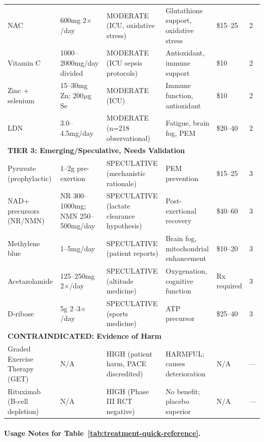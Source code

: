\begin{table}[htbp]
\begin{tabular}{p{3cm}p{2cm}p{2.5cm}p{3cm}p{2cm}p{1.5cm}}
NAC & 600mg 2$\times$/day & MODERATE (ICU, oxidative stress) & Glutathione support, oxidative stress & \$15--25 & 2 \\
Vitamin C & 1000--2000mg/day divided & MODERATE (ICU sepsis protocols) & Antioxidant, immune support & \$10 & 2 \\
Zinc + selenium & 15--30mg Zn; 200$\mu$g Se & MODERATE (ICU) & Immune function, antioxidant & \$10 & 2 \\
LDN & 3.0--4.5mg/day & MODERATE (n=218 observational) & Fatigue, brain fog, PEM & \$20--40 & 2 \\
\midrule
\multicolumn{6}{l}{\textbf{TIER 3: Emerging/Speculative, Needs Validation}} \\
\midrule
Pyruvate (prophylactic) & 1--2g pre-exertion & SPECULATIVE (mechanistic rationale) & PEM prevention & \$15--25 & 3 \\
NAD+ precursors (NR/NMN) & NR 300--1000mg; NMN 250--500mg/day & SPECULATIVE (lactate clearance hypothesis) & Post-exertional recovery & \$40--60 & 3 \\
Methylene blue & 1--5mg/day & SPECULATIVE (patient reports) & Brain fog, mitochondrial enhancement & \$10--20 & 3 \\
Acetazolamide & 125--250mg 2$\times$/day & SPECULATIVE (altitude medicine) & Oxygenation, cognitive function & Rx required & 3 \\
D-ribose & 5g 2--3$\times$/day & SPECULATIVE (sports medicine) & ATP precursor & \$25--40 & 3 \\
\midrule
\multicolumn{6}{l}{\textbf{CONTRAINDICATED: Evidence of Harm}} \\
\midrule
Graded Exercise Therapy (GET) & N/A & HIGH (patient harm, PACE discredited) & HARMFUL; causes deterioration & N/A & — \\
Rituximab (B-cell depletion) & N/A & HIGH (Phase III RCT negative) & No benefit; placebo superior & N/A & — \\
\bottomrule
\end{tabular}
\end{table}

\paragraph{Usage Notes for Table~\ref{tab:treatment-quick-reference}.}

